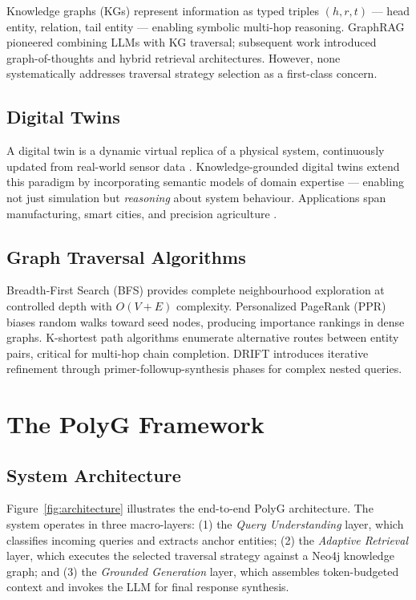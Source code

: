 \documentclass[12pt,a4paper]{article}
\begin{document}
Knowledge graphs (KGs) represent information as typed triples
$(h, r, t)$ — head entity, relation, tail entity — enabling symbolic
multi-hop reasoning. GraphRAG \cite{edge2024graphrag} pioneered combining LLMs
with KG traversal; subsequent work introduced graph-of-thoughts
\cite{besta2023got} and hybrid retrieval architectures. However, none
systematically addresses traversal strategy selection as a first-class concern.

\subsection{Digital Twins}

A digital twin is a dynamic virtual replica of a physical system, continuously
updated from real-world sensor data \cite{grieves2014dt}. Knowledge-grounded
digital twins extend this paradigm by incorporating semantic models of domain
expertise — enabling not just simulation but \emph{reasoning} about system
behaviour. Applications span manufacturing, smart cities, and precision
agriculture \cite{verdouw2021adt}.

\subsection{Graph Traversal Algorithms}

Breadth-First Search (BFS) provides complete neighbourhood exploration at
controlled depth with $O(V + E)$ complexity. Personalized PageRank (PPR)
\cite{page1999pagerank} biases random walks toward seed nodes, producing
importance rankings in dense graphs. K-shortest path algorithms
\cite{yen1971ksp} enumerate alternative routes between entity pairs, critical
for multi-hop chain completion. DRIFT \cite{edge2024drift} introduces iterative
refinement through primer-followup-synthesis phases for complex nested queries.

\section{The PolyG Framework}

\subsection{System Architecture}

Figure~\ref{fig:architecture} illustrates the end-to-end PolyG architecture.
The system operates in three macro-layers: (1) the \emph{Query Understanding}
layer, which classifies incoming queries and extracts anchor entities;
(2) the \emph{Adaptive Retrieval} layer, which executes the selected traversal
strategy against a Neo4j knowledge graph; and (3) the \emph{Grounded Generation}
layer, which assembles token-budgeted context and invokes the LLM for final
response synthesis.
\end{document}
